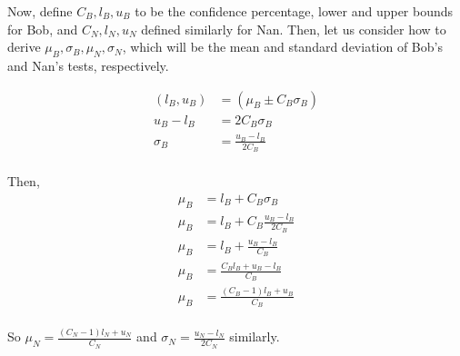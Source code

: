 \documentclass[12pt]{article}
\begin{document}
\begin{enumerate}
    Now, define $C_B,l_B,u_B$ to be the confidence percentage, lower and upper
    bounds for Bob, and $C_N,l_N,u_N$ defined similarly for Nan. Then, let us
    consider how to derive $\mu_B,\sigma_B,\mu_N,\sigma_N$, which will be the
    mean and standard deviation of Bob's and Nan's tests, respectively.

    \begin{equation}
      \begin{split}
        (l_B,u_B)&=(\mu_B\pm C_B\sigma_B)\\
        u_B-l_B&=2C_B\sigma_B\\
        \sigma_B&=\frac{u_B-l_B}{2C_B}\\
      \end{split}
    \end{equation}

    Then,
    \begin{equation}
      \begin{split}
        \mu_B&=l_B+C_B\sigma_B\\
        \mu_B&=l_B+C_B\frac{u_B-l_B}{2C_B}\\
        \mu_B&=l_B+\frac{u_B-l_B}{C_B}\\
        \mu_B&=\frac{C_Bl_B+u_B-l_B}{C_B}\\
        \mu_B&=\frac{\left(C_B-1\right)l_B+u_B}{C_B}\\
      \end{split}
    \end{equation}

    So $\mu_N=\frac{\left(C_N-1\right)l_N+u_N}{C_N}$ and
    $\sigma_N=\frac{u_N-l_N}{2C_N}$ similarly.


\end{enumerate}
\end{document}
